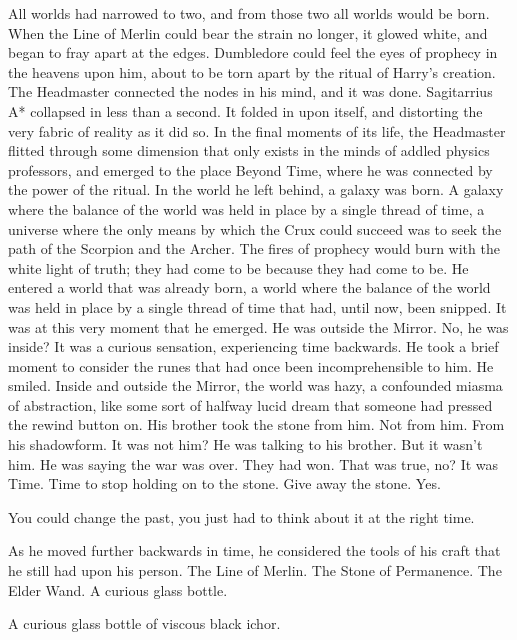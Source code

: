All worlds had narrowed to two, and from those two all worlds would be born. When the Line of Merlin could bear the strain no longer, it glowed white, and began to fray apart at the edges. Dumbledore could feel the eyes of prophecy in the heavens upon him, about to be torn apart by the ritual of Harry’s creation. The Headmaster connected the nodes in his mind, and it was done.
\SomeVSpace
Sagitarrius A* collapsed in less than a second. It folded in upon itself, and distorting the very fabric of reality as it did so. In the final moments of its life, the Headmaster flitted through some dimension that only exists in the minds of addled physics professors, and emerged to the place Beyond Time, where he was connected by the power of the ritual.
\SmallVSpace
In the world he left behind, a galaxy was born. A galaxy where the balance of the world was held in place by a single thread of time, a universe where the only means by which the Crux could succeed was to seek the path of the Scorpion and the Archer. The fires of prophecy would burn with the white light of truth; they had come to be because they had come to be.
\SmallVSpace
He entered a world that was already born, a world where the balance of the world was held in place by a single thread of time that had, until now, been snipped. It was at this very moment that he emerged. He was outside the Mirror. No, he was inside? It was a curious sensation, experiencing time backwards. He took a brief moment to consider the runes that had once been incomprehensible to him. He smiled.
\SomeVSpace
Inside and outside the Mirror, the world was hazy, a confounded miasma of abstraction, like some sort of halfway lucid dream that someone had pressed the rewind button on. His brother took the stone from him. Not from him. From his shadowform. It was not him?  He was talking to his brother. But it wasn’t him. He was saying the war was over. They had won. That was true, no? It was Time. Time to stop holding on to the stone. Give away the stone. Yes.

You could change the past, you just had to think about it at the right time.

As he moved further backwards in time, he considered the tools of his craft that he still had upon his person. The Line of Merlin. The Stone of Permanence. The Elder Wand. A curious glass bottle.

A curious glass bottle of viscous black ichor.

\simpleline


